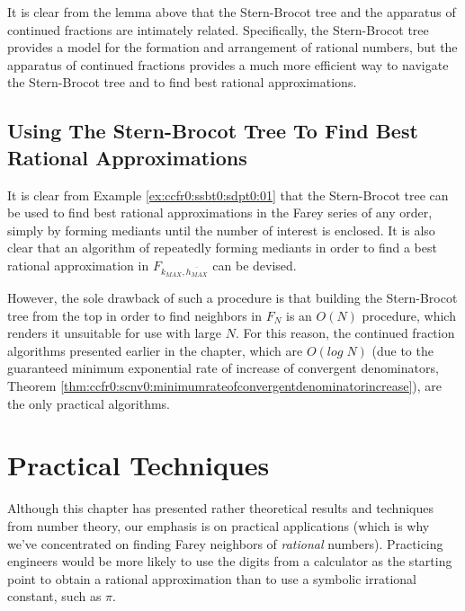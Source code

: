 It is clear from the lemma above that the Stern-Brocot tree and the 
apparatus of continued fractions are intimately related.  Specifically,
the Stern-Brocot tree provides a model for the formation and arrangement
of rational numbers, but the apparatus of continued fractions provides
a much more efficient way to navigate the Stern-Brocot tree and to find
best rational approximations.

\subsection{Using The Stern-Brocot Tree To Find Best Rational Approximations}
\label{ccfr0:ssbt0:susb0}

It is clear from Example \ref{ex:ccfr0:ssbt0:sdpt0:01} that the Stern-Brocot
tree can be used to find best rational approximations in the Farey series
of any order, simply by forming mediants until the number of interest
is enclosed.  It is also clear that an algorithm of repeatedly forming
mediants in order to find a best rational approximation in
$F_{k_{MAX}, \overline{h_{MAX}}}$ can be devised.

However, the sole drawback of such a procedure is that building the Stern-Brocot
tree from the top in order to find neighbors in $F_N$ is an
$O(N)$ procedure, which renders it unsuitable for use with large
$N$.  For this reason, the continued fraction algorithms presented
earlier in the chapter, which are $O(log \; N)$ (due to the 
guaranteed minimum exponential rate of increase of convergent
denominators, Theorem \ref{thm:ccfr0:scnv0:minimumrateofconvergentdenominatorincrease}),
are the only practical algorithms.


\section{Practical Techniques}

Although this chapter has presented rather theoretical results and techniques
from number theory, our emphasis is on practical applications (which is why
we've concentrated on finding Farey neighbors of \emph{rational} numbers).
Practicing engineers would be more likely to use the digits from a calculator
as the starting point to obtain a rational approximation than to use 
a symbolic irrational constant, such as $\pi$.


